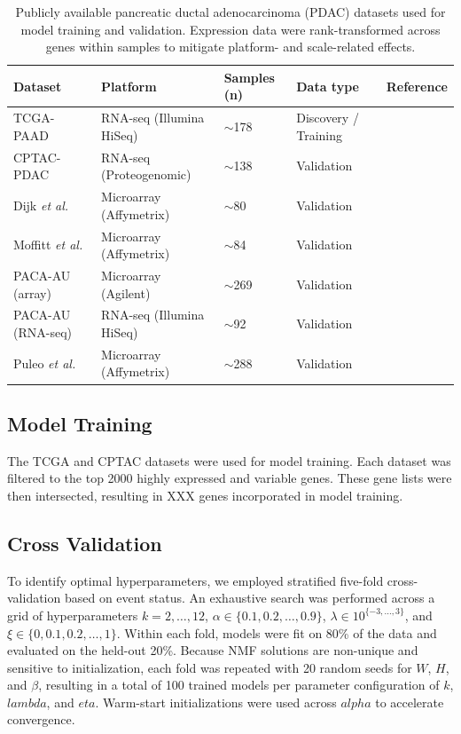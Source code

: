 \documentclass[9pt,twocolumn,twoside,]{pnas-new}
\begin{document}
\begin{table}[t]
\centering
\caption{Publicly available pancreatic ductal adenocarcinoma (PDAC) datasets used for model training and validation. Expression data were rank-transformed across genes within samples to mitigate platform- and scale-related effects.}
\label{tab:datasets}
\begin{tabular}{@{}lllll@{}}
\toprule
\textbf{Dataset} & \textbf{Platform} & \textbf{Samples (n)} & \textbf{Data type} & \textbf{Reference} \\ 
\midrule
TCGA-PAAD & RNA-seq (Illumina HiSeq) & $\sim$178 & Discovery / Training & \citep{TCGA2017} \\
CPTAC-PDAC & RNA-seq (Proteogenomic) & $\sim$138 & Validation & \citep{Clark2021} \\
Dijk \textit{et al.} & Microarray (Affymetrix) & $\sim$80 & Validation & \citep{Dijk2015} \\
Moffitt \textit{et al.} & Microarray (Affymetrix) & $\sim$84 & Validation & \citep{Moffitt2015} \\
PACA-AU (array) & Microarray (Agilent) & $\sim$269 & Validation & \citep{Bailey2016} \\
PACA-AU (RNA-seq) & RNA-seq (Illumina HiSeq) & $\sim$92 & Validation & \citep{Bailey2016} \\
Puleo \textit{et al.} & Microarray (Affymetrix) & $\sim$288 & Validation & \citep{Puleo2018} \\ 
\bottomrule
\end{tabular}
\end{table}

\subsection*{Model Training}\label{model-training}

The TCGA and CPTAC datasets were used for model training. Each dataset
was filtered to the top 2000 highly expressed and variable genes. These
gene lists were then intersected, resulting in XXX genes incorporated in
model training.

\subsection{Cross Validation}\label{cross-validation}

To identify optimal hyperparameters, we employed stratified five-fold
cross-validation based on event status. An exhaustive search was
performed across a grid of hyperparameters \(k = 2,\dots,12\),
\(\alpha \in \{0.1,0.2,\dots,0.9\}\), \(\lambda \in 10^{\{-3,...,3\}}\),
and \(\xi \in \{0,0.1,0.2,\dots,1\}\). Within each fold, models were fit
on 80\% of the data and evaluated on the held-out 20\%. Because NMF
solutions are non-unique and sensitive to initialization, each fold was
repeated with 20 random seeds for \(W\), \(H\), and \(\beta\), resulting
in a total of 100 trained models per parameter configuration of \(k\),
\(lambda\), and \(eta\). Warm-start initializations were used across
\(alpha\) to accelerate convergence.
\end{document}
